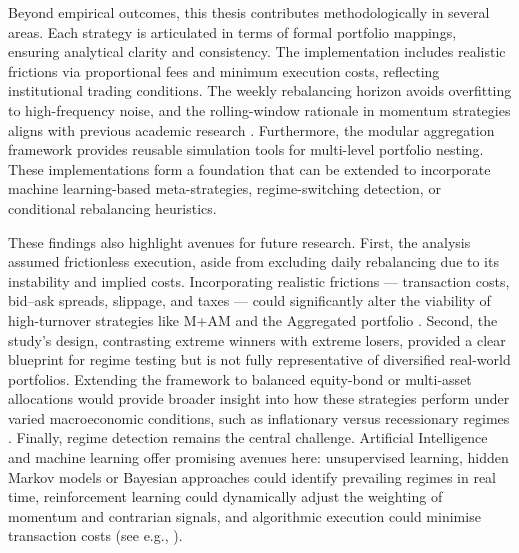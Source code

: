 \documentclass[12pt,a4paper]{report}
\begin{document}
Beyond empirical outcomes, this thesis contributes methodologically in several areas. Each strategy is articulated in terms of formal portfolio mappings, ensuring analytical clarity and consistency. The implementation includes realistic frictions via proportional fees and minimum execution costs, reflecting institutional trading conditions. The weekly rebalancing horizon avoids overfitting to high-frequency noise, and the rolling-window rationale in momentum strategies aligns with previous academic research \citep{Jegadeesh1993, Ilmanen2011}. Furthermore, the modular aggregation framework provides reusable simulation tools for multi-level portfolio nesting. These implementations form a foundation that can be extended to incorporate machine learning-based meta-strategies, regime-switching detection, or conditional rebalancing heuristics.

These findings also highlight avenues for future research. First, the analysis assumed frictionless execution, aside from excluding daily rebalancing due to its instability and implied costs. Incorporating realistic frictions — transaction costs, bid–ask spreads, slippage, and taxes — could significantly alter the viability of high-turnover strategies like M+AM and the Aggregated portfolio \citep{DeMiguel2009, vanVliet2016}. Second, the study’s design, contrasting extreme winners with extreme losers, provided a clear blueprint for regime testing but is not fully representative of diversified real-world portfolios. Extending the framework to balanced equity-bond or multi-asset allocations would provide broader insight into how these strategies perform under varied macroeconomic conditions, such as inflationary versus recessionary regimes \citep{Ilmanen2011}. Finally, regime detection remains the central challenge. Artificial Intelligence and machine learning offer promising avenues here: unsupervised learning, hidden Markov models or Bayesian approaches could identify prevailing regimes in real time, reinforcement learning could dynamically adjust the weighting of momentum and contrarian signals, and algorithmic execution could minimise transaction costs (see e.g., \citealp{Bryzgalova2023}).
\end{document}
